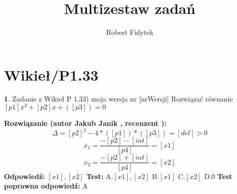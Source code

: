 \documentclass[12pt, a4paper]{article}
\title{Multizestaw zadań}
\author{Robert Fidytek}
\date{}
\theoremstyle{definition} %
\newtheorem{zad}{}
\newcommand{\kategoria}[1]{\section{#1}} %
\newcommand{\zadStart}[1]{\begin{zad}#1\newline} %
\newcommand{\zadStop}{\end{zad}}   %
\newcommand{\rozwStart}[2]{\noindent \textbf{Rozwiązanie (autor #1 , recenzent #2): }\newline} %
\newcommand{\rozwStop}{\newline}                                            %
\newcommand{\odpStart}{\noindent \textbf{Odpowiedź:}\newline}    %
\newcommand{\odpStop}{\newline}                                             %
\newcommand{\testStart}{\noindent \textbf{Test:}\newline} %
\newcommand{\testStop}{\newline} %
\newcommand{\kluczStart}{\noindent \textbf{Test poprawna odpowiedź:}\newline} %
\newcommand{\kluczStop}{\newline} %
\begin{document}
\maketitle


\kategoria{Wikieł/P1.33}
\zadStart{Zadanie z Wikieł P 1.33) moja wersja nr [nrWersji]}
Rozwiązać równanie $[p1]x^2 + [p2]x +([p3]) = 0$
\zadStop
\rozwStart{Jakub Janik}{}
$$\Delta = [p2]^2 - 4*([p1])*([p3]) = [del] > 0$$
$$x_1 = \frac{-[p2]-[int]}{[p4]}=[x1]$$
$$x_2 = \frac{-[p2]+[int]}{[p4]}=[x2]$$
\rozwStop
\odpStart
$[x1], [x2]$
\odpStop
\testStart
A.$[x1],[x2]$
B.$[x1]$
C.$[x2]$
D.$0$
\testStop
\kluczStart
A
\kluczStop
\end{document}
